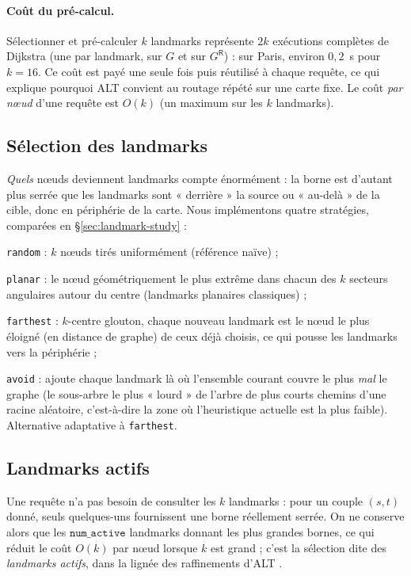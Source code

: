\paragraph{Coût du pré-calcul.} Sélectionner et pré-calculer $k$ landmarks
représente $2k$ exécutions complètes de Dijkstra (une par landmark, sur $G$ et sur
$G^{\mathsf R}$) : sur Paris, environ $0{,}2$~s pour $k = 16$. Ce coût est payé
une seule fois puis réutilisé à chaque requête, ce qui explique pourquoi ALT
convient au routage répété sur une carte fixe. Le coût \emph{par nœud} d'une
requête est $O(k)$ (un maximum sur les $k$ landmarks).

\subsection{Sélection des landmarks}
\label{sec:landmark-select}

\emph{Quels} nœuds deviennent landmarks compte énormément : la borne est d'autant
plus serrée que les landmarks sont « derrière » la source ou « au-delà » de la
cible, donc en périphérie de la carte. Nous implémentons quatre stratégies,
comparées en \S\ref{sec:landmark-study} :

\begin{bulletlist}
  \item \texttt{random} : $k$ nœuds tirés uniformément (référence naïve) ;
  \item \texttt{planar} : le nœud géométriquement le plus extrême dans chacun
        des $k$ secteurs angulaires autour du centre (landmarks planaires
        classiques) ;
  \item \texttt{farthest} : $k$-centre glouton, chaque nouveau landmark est le
        nœud le plus éloigné (en distance de graphe) de ceux déjà choisis, ce qui
        pousse les landmarks vers la périphérie ;
  \item \texttt{avoid} \citep{goldberg2005avoid} : ajoute chaque landmark là où
        l'ensemble courant couvre le plus \emph{mal} le graphe (le sous-arbre le
        plus « lourd » de l'arbre de plus courts chemins d'une racine aléatoire,
        c'est-à-dire la zone où l'heuristique actuelle est la plus faible).
        Alternative adaptative à \texttt{farthest}.
\end{bulletlist}

\subsection{Landmarks actifs}
\label{sec:active}
Une requête n'a pas besoin de consulter les $k$ landmarks : pour un couple
$(s,t)$ donné, seuls quelques-uns fournissent une borne réellement serrée. On ne
conserve alors que les $\texttt{num\_active}$ landmarks donnant les plus grandes
bornes, ce qui réduit le coût $O(k)$ par nœud lorsque $k$ est grand ; c'est la
sélection dite des \emph{landmarks actifs}, dans la lignée des raffinements d'ALT
\citep{goldberg2005alt}.

